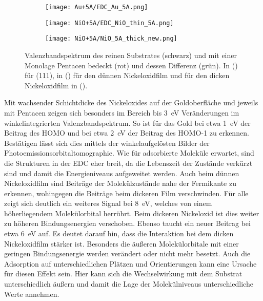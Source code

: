             \begin{figure}
                \centering
                \begin{subfigure}[t]{0.30\textwidth}
                    \centering
                    \texttt{[image: Au+5A/EDC\_Au\_5A.png]}
                    \subcaption{}
                    \label{fig:EDC_Au+5A}
                \end{subfigure}
                \begin{subfigure}[t]{0.30\textwidth}
                    \centering
                    \texttt{[image: NiO+5A/EDC\_NiO\_thin\_5A.png]}
                    \subcaption{}
                    \label{fig:EDC_NiO_thin+5A}
                \end{subfigure}
                \begin{subfigure}[t]{0.30\textwidth}
                    \centering
                    \texttt{[image: NiO+5A/NiO\_5A\_thick\_new.png]}
                    \subcaption{}
                    \label{fig:EDC_NiO+5A}
                \end{subfigure}
                \caption{Valenzbandspektrum des reinen Substrates (schwarz) und mit einer Monolage Pentacen bedeckt (rot) und dessen Differenz (grün).
                In () für (111), in () für den dünnen Nickeloxidfilm und für den dicken Nickeloxidfilm in ().}
            \end{figure}
            Mit wachsender Schichtdicke des Nickeloxides auf der Goldoberfläche und jeweils mit Pentacen zeigen sich besonders im Bereich bis \SI{3}{\electronvolt} Veränderungen im winkelintegrierten Valenzbandspektrum.
            So ist für das Gold bei etwa \SI{1}{\electronvolt} der Beitrag des HOMO und bei etwa \SI{2}{\electronvolt} der Beitrag des HOMO-1 zu erkennen.
            Bestätigen lässt sich dies mittels der winkelaufgelösten Bilder der Photoemissionsorbitaltomographie.
            Wie für adsorbierte Moleküle erwartet, sind die Strukturen in der EDC eher breit, da die Lebenszeit der Zustände verkürzt sind und damit die Energieniveaus aufgeweitet werden.
            Auch beim dünnen Nickeloxidfilm sind Beiträge der Molekülzustände nahe der Fermikante zu erkennen, wohingegen die Beiträge beim dickeren Film verschwinden.
            Für alle zeigt sich deutlich ein weiteres Signal bei \SI{8}{\electronvolt}, welches von einem höherliegendem Molekülorbital herrührt.
            Beim dickeren Nickeloxid ist dies weiter zu höheren Bindungsenergien verschoben.
            Ebenso taucht ein neuer Beitrag bei etwa \SI{6}{\electronvolt} auf.
            Es deutet darauf hin, dass die Interaktion bei dem dicken Nickeloxidfilm stärker ist.
            Besonders die äußeren Molekülorbitale mit einer geringen Bindungsenergie werden verändert oder nicht mehr besetzt.
            Auch die Adsorption auf unterschiedlichen Plätzen und Orientierungen kann eine Ursache für diesen Effekt sein.
            Hier kann sich die Wechselwirkung mit dem Substrat unterschiedlich äußern und damit die Lage der Molekülniveaus unterschiedliche Werte annehmen.

